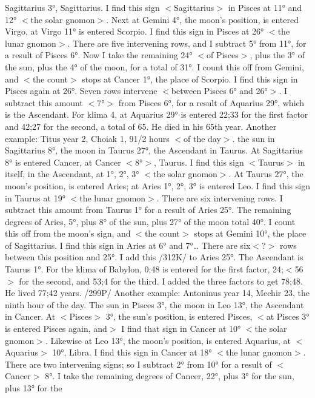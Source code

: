 Sagittarius 3°, Sagittarius. I find this sign $<$Sagittarius$>$ in Pisces at 11° and 12° $<$the solar gnomon$>$.
Next at Gemini 4°, the moon’s position, is entered Virgo, at Virgo 11° is entered Scorpio. I find this sign
in Pisces at 26° $<$the lunar gnomon$>$. There are five intervening rows, and I subtract 5° from 11°, for a
result of Pisces 6°. Now I take the remaining 24° $<$of Pisces$>$, plus the 3° of the sun, plus the 4° of the
moon, for a total of 31°. I count this off from Gemini, and $<$the count$>$ stops at Cancer 1°, the place of
Scorpio. I find this sign in Pisces again at 26°. Seven rows intervene $<$between Pisces 6° and 26°$>$. I
subtract this amount $<$7°$>$ from Pisces 6°, for a result of Aquarius 29°, which is the Ascendant. For klima
4, at Aquarius 29° is entered 22;33 for the first factor and 42;27 for the second, a total of 65. He died in his
65th year.
Another example: Titus year 2, Choiak 1, 91/2 hours $<$of the day$>$. the sun in Sagittarius 8°, the
moon in Taurus 27°, the Ascendant in Taurus. At Sagittarius 8° is entered Cancer, at Cancer $<$8°$>$,
Taurus. I find this sign $<$Taurus$>$ in itself, in the Ascendant, at 1°, 2°, 3° $<$the solar gnomon$>$. At
Taurus 27°, the moon’s position, is entered Aries; at Aries 1°, 2°, 3° is entered Leo. I find this sign in
Taurus at 19° $<$the lunar gnomon$>$. There are six intervening rows. I subtract this amount from Taurus
1° for a result of Aries 25°. The remaining degrees of Aries, 5°, plus 8° of the sun, plus 27° of the moon
total 40°. I count this off from the moon’s sign, and $<$the count$>$ stops at Gemini 10°, the place of
Sagittarius. I find this sign in Aries at 6° and 7°… There are six$<$?$>$ rows between this position and 25°.
I add this /312K/ to Aries 25°. The Ascendant is Taurus 1°. For the klima of Babylon, 0;48 is entered
for the first factor, 24;$<$56$>$ for the second, and 53;4 for the third. I added the three factors to get 78;48. He
lived 77;42 years.
/299P/ Another example: Antoninus year 14, Mechir 23, the ninth hour of the day. The sun in Pisces
3°, the moon in Leo 13°, the Ascendant in Cancer. At $<$Pisces$>$ 3°, the sun’s position, is entered Pisces,
$<$at Pisces 3° is entered Pisces again, and$>$ I find that sign in Cancer at 10° $<$the solar gnomon$>$.
Likewise at Leo 13°, the moon’s position, is entered Aquarius, at $<$Aquarius$>$ 10°, Libra. I find this sign
in Cancer at 18° $<$the lunar gnomon$>$. There are two intervening signs; so I subtract 2° from 10° for a
result of $<$Cancer$>$ 8°. I take the remaining degrees of Cancer, 22°, plus 3° for the sun, plus 13° for the
